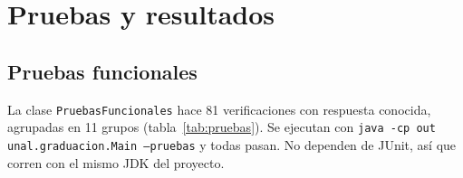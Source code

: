 \documentclass[11pt,letterpaper]{article}
\begin{document}
\section{Pruebas y resultados}\label{sec:pruebas}

\subsection{Pruebas funcionales}
La clase \texttt{PruebasFuncionales} hace 81 verificaciones con respuesta conocida, agrupadas en 11 grupos (tabla~\ref{tab:pruebas}). Se ejecutan con \texttt{java -cp out unal.graduacion.Main --pruebas} y todas pasan. No dependen de JUnit, así que corren con el mismo JDK del proyecto.
\end{document}
